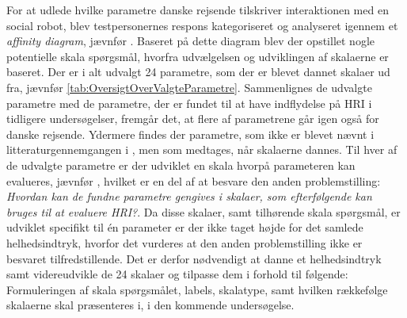 \noindent
%
For at udlede hvilke parametre danske rejsende tilskriver interaktionen med en social robot, blev testpersonernes respons kategoriseret og analyseret igennem et \textit{affinity diagram}, jævnfør . Baseret på dette diagram blev der opstillet nogle potentielle skala spørgsmål, hvorfra udvælgelsen og udviklingen af skalaerne er baseret. Der er i alt udvalgt 24 parametre, som der er blevet dannet skalaer ud fra, jævnfør \autoref{tab:OversigtOverValgteParametre}. Sammenlignes de udvalgte parametre med de parametre, der er fundet til at have indflydelse på HRI i tidligere undersøgelser, fremgår det, at flere af parametrene går igen også for danske rejsende. Ydermere findes der parametre, som ikke er blevet nævnt i litteraturgennemgangen i , men som medtages, når skalaerne dannes.\blankline
%
Til hver af de udvalgte parametre er der udviklet en skala hvorpå parameteren kan evalueres, jævnfør , hvilket er en del af at besvare den anden problemstilling: \textit{Hvordan kan de fundne parametre gengives i skalaer, som efterfølgende kan bruges til at evaluere HRI?}. Da disse skalaer, samt tilhørende skala spørgsmål, er udviklet specifikt til én parameter er der ikke taget højde for det samlede helhedsindtryk, hvorfor det vurderes at den anden problemstilling ikke er besvaret tilfredstillende. Det er derfor nødvendigt at danne et helhedsindtryk samt videreudvikle de 24 skalaer og tilpasse dem i forhold til følgende: Formuleringen af skala spørgsmålet, labels, skalatype, samt hvilken rækkefølge skalaerne skal præsenteres i, i den kommende undersøgelse.    





